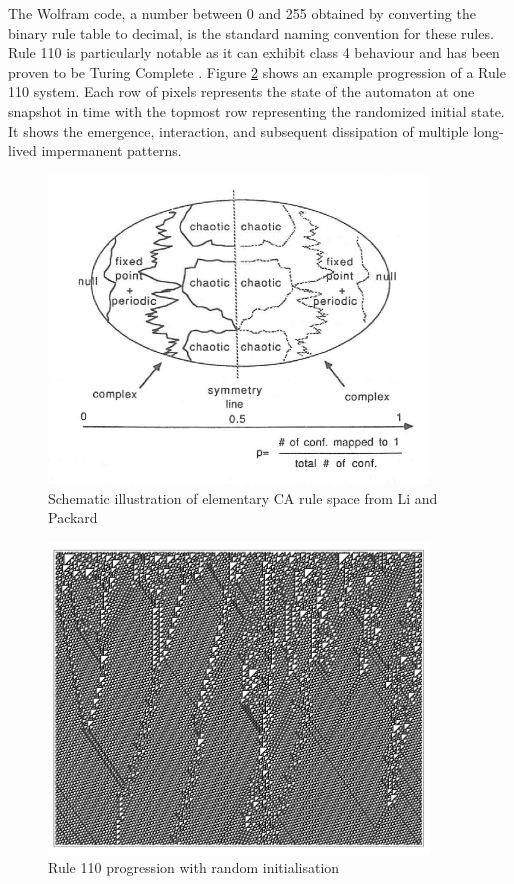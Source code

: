 The Wolfram code, a number between 0 and 255 obtained by converting the binary rule table to decimal, is the standard naming convention for these rules. Rule 110 is particularly notable as it can exhibit class 4 behaviour \cite{wolfram2002} and has been proven to be Turing Complete \cite{cook2004universality}. Figure \ref{fig:rule-110} shows an example progression of a Rule 110 system. Each row of pixels represents the state of the automaton at one snapshot in time with the topmost row representing the randomized initial state. It shows the emergence, interaction, and subsequent dissipation of multiple long-lived impermanent patterns.

\begin{figure}[!h]
\centering
\includegraphics[width=0.9\textwidth]{images/rule-space.png}
\caption{Schematic illustration of elementary CA rule space from Li and Packard \cite{li1990structure}}
\label{fig:rule-space}
\end{figure}

\begin{figure}[!h]
\centering
\includegraphics[width=0.9\textwidth]{images/rule-110.png}
\caption{Rule 110 progression with random initialisation \cite{wolfram2002}}
\label{fig:rule-110}
\end{figure}

